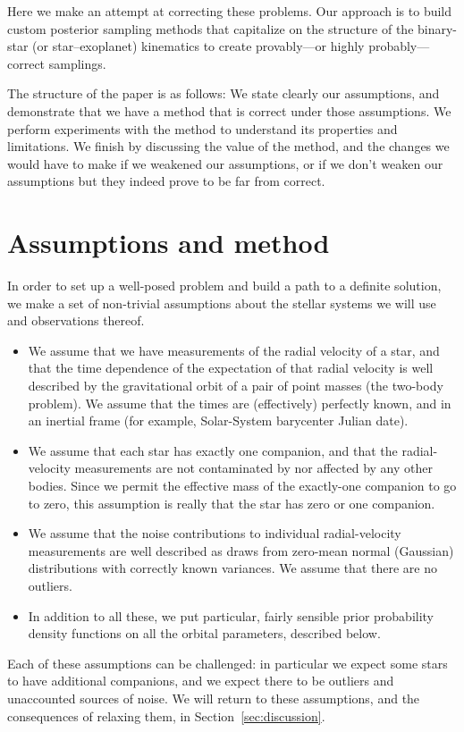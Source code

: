 \documentclass[manuscript, letterpaper]{aastex6}
\newcommand{\sectionname}{Section}
\begin{document}
Here we make an attempt at correcting these problems.
Our approach is to build custom posterior sampling methods that
capitalize on the structure of the binary-star (or star--exoplanet)
kinematics to create provably---or highly probably---correct
samplings.

The structure of the paper is as follows:
We state clearly our assumptions, and demonstrate that we have a
method that is correct under those assumptions.
We perform experiments with the method to understand its properties
and limitations.
We finish by discussing the value of the method, and the changes we
would have to make if we weakened our assumptions, or if we don't
weaken our assumptions but they indeed prove to be far from correct.

\section{Assumptions and method} \label{sec:method}

In order to set up a well-posed problem and build a path to a
definite solution, we make a set of non-trivial assumptions about the
stellar systems we will use and observations thereof.
\begin{itemize}\itemsep0ex
\item We assume that we have measurements of the radial velocity of a
  star, and that the time dependence of the expectation of that radial
  velocity is well described by the gravitational orbit of a pair of
  point masses (the two-body problem). We assume that the times are
  (effectively) perfectly known, and in an inertial frame (for
  example, Solar-System barycenter Julian date).
\item We assume that each star has exactly one companion, and that the
  radial-velocity measurements are not contaminated by nor affected by
  any other bodies. Since we permit the effective mass of the
  exactly-one companion to go to zero, this assumption is really that
  the star has zero or one companion.
\item We assume that the noise contributions to individual
  radial-velocity measurements are well described as draws from
  zero-mean normal (Gaussian) distributions with correctly known
  variances. We assume that there are no outliers.
\item In addition to all these, we put particular, fairly sensible
  prior probability density functions on all the orbital parameters,
  described below.
\end{itemize}
Each of these assumptions can be challenged: in particular we expect some stars
to have additional companions, and we expect there to be outliers and
unaccounted sources of noise.
We will return to these assumptions, and the consequences of relaxing them, in
\sectionname~\ref{sec:discussion}.
\end{document}
